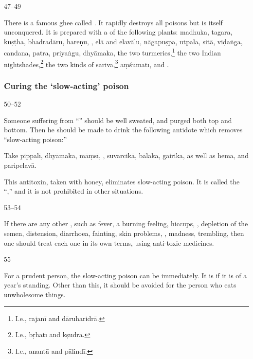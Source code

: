   \begin{translation}
    
    \item[47--49]
    
    \label{ajeya} There is a famous ghee called . It
rapidly destroys all poisons but is itself unconquered. It is prepared with a
 of the following plants: %
\gls{madhuka},
\gls{tagara},
\gls{kuṣṭha},
\gls{bhadradāru},
\gls{hareṇu},
,
\gls{elā}
and \gls{elavālu},
\gls{nāgapuṣpa},
\gls{utpala},
\gls{sitā},
\gls{viḍaṅga},
\gls{candana},
\gls{patra},
\gls{priyaṅgu},
\gls{dhyāmaka},
the two turmerics,\footnote{I.e., \gls{rajanī} and \gls{dāruharidrā}.}
the two Indian nightshades,\footnote{I.e., \gls{bṛhatī} and \gls{kṣudrā}.}
the two kinds of \gls{sārivā},\footnote{I.e., \gls{anantā} and \gls{pālindī}.}
\gls{aṃśumatī},
and 
.
    
    \end{translation}

\subsubsection{Curing the `slow-acting' poison}
    

\begin{translation}    
    
    \item[ 50--52]
    
Someone suffering from “” should be
well sweated, and purged both top and bottom.  Then he should be made
to drink the following  antidote which removes
“slow-acting poison:”
    
    Take
    \gls{pippalī},
    \gls{dhyāmaka},
    \gls{māṃsī},
,
\gls{suvarcikā},
\gls{bālaka}, 
\gls{gairika}, as well as \gls{hema},
and
\gls{paripelavā}.

This antitoxin, taken with honey, eliminates slow-acting poison. It is called the
“,” and it is not prohibited in other situations.
 
    \item[ 53--54]

If there are any other , such as fever, a
burning feeling, hiccups, , depletion of the
semen, distension, diarrhoea, fainting, skin problems,
, madness, trembling, then one should treat
each one in its own terms,  using anti-toxic medicines.
    
    \item[ 55] 
    
For a prudent person, the slow-acting poison can be
 immediately.  It is  if it is
of a year's standing. Other than this, it should be avoided for the
person who eats unwholesome things.

    \end{translation}


